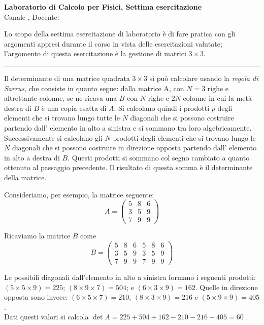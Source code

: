 \documentclass[11pt]{article}
\begin{document}
\pagestyle{empty}

\begin{center}
{\Large \bf  Laboratorio di Calcolo per Fisici, Settima esercitazione\\[2mm]}
{\large Canale \canale, Docente: \docente}
\end{center}
\vspace{4mm}

\begin{mdframed}[backgroundcolor=gray!10]
  Lo scopo della settima esercitazione di laboratorio è di fare pratica con
gli argomenti appresi durante il corso in vista delle esercitazioni valutate;
l'argomento di questa esercitazione è la gestione di matrici $3 \times 3$.
  \end{mdframed}
%
%



\hrule
\vspace{2mm}
Il determinante di una matrice quadrata $3 \times 3$ si pu\`{o} calcolare usando la {\em regola di Sarrus}, che consiste in quanto segue: dalla matrice A, con $N = 3$ righe 
e altrettante colonne, se ne ricava una $B$ con $N$ righe e $2N$ colonne in
cui la met\`{a} destra di $B$ \`{e} una copia esatta di $A$. Si calcolano quindi i prodotti $p$ degli elementi che si trovano
lungo tutte le $N$ diagonali che si possono costruire partendo dall' elemento in alto a sinistra e si sommano tra loro
algebricamente. Successivamente si calcolano gli $N$ prodotti degli elementi che si trovano lungo le $N$ diagonali che
si possono costruire in direzione opposta partendo dall' elemento in alto a destra di $B$. Questi prodotti si sommano
col segno cambiato a quanto ottenuto al passaggio precedente. Il risultato di questa somma \`{e} il determinante della
matrice.

Consideriamo, per esempio, la matrice seguente:
\[
A = \left(\begin{array}{ccc}
5 &8& 6\\
3 &5 &9\\
7 & 9 & 9
\end{array}
\right)
\]

Ricaviamo la matrice $B$ come
\[
B = \left(\begin{array}{cccccc}
5 & 8 & 6 &5 & 8 & 6\\
3 & 5 & 9 &3 &5  &9\\
7 & 9 & 9 &7 &9 & 9
\end{array}
\right)
\]

Le possibili diagonali dall'elemento in alto a sinistra formano i seguenti prodotti: $(5 \times 5 \times 9)= 225$;
$(8 \times 9 \times 7)= 504$; 
e $(6\times3\times9)=162$. Quelle in direzione opposta sono invece: 
$(6\times5\times7)=210$, $(8\times3\times9)=216$ e $(5\times9\times9)=405$.
\\
Dati questi valori si calcola
$\det A = 225 + 504 +162 - 210 - 216 -405= 60$ .
\end{document}
